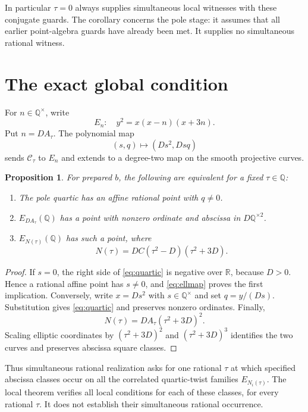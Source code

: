 \documentclass[11pt,a4paper]{article}
\newtheorem{proposition}[theorem]{Proposition}
\theoremstyle{definition}\newtheorem{definition}[theorem]{Definition}
\newcommand{\Q}{\mathbb Q}\newcommand{\F}{\mathbb F}
\begin{document}
In particular $\tau=0$ always supplies simultaneous local witnesses with
these conjugate guards. The corollary concerns the pole stage: it assumes
that all earlier point-algebra guards have already been met. It supplies
no simultaneous rational witness.

\section{The exact global condition}

For $n\in\Q^\times$, write
\[
                        E_n:\quad y^2=x(x-n)(x+3n).
\]
Put $n=DA_\tau$. The polynomial map
\begin{equation}\label{eq:ellmap}
                    (s,q)\longmapsto (Ds^2,Dsq)
\end{equation}
sends $\mathcal C_\tau$ to $E_n$ and extends to a degree-two map on
the smooth projective curves.

\begin{samepage}
\begin{proposition}\label{prop:global}
For prepared $b$, the following are equivalent for a fixed $\tau\in\Q$:
\begin{enumerate}
\item The pole quartic has an affine rational point with $q\ne0$.
\item $E_{DA_\tau}(\Q)$ has a point with nonzero ordinate and abscissa
in $D\Q^{\times2}$.
\item $E_{N(\tau)}(\Q)$ has such a point, where
\[
             N(\tau)=DC(\tau^2-D)(\tau^2+3D).
\]
\end{enumerate}
\end{proposition}
\end{samepage}
\begin{proof}
If $s=0$, the right side of \eqref{eq:quartic} is negative over
$\mathbb R$, because $D>0$. Hence a rational affine point has $s\ne0$,
and \eqref{eq:ellmap} proves the first implication. Conversely, write
$x=Ds^2$ with $s\in\Q^\times$ and set $q=y/(Ds)$. Substitution gives
\eqref{eq:quartic} and preserves nonzero ordinates. Finally,
\[
        N(\tau)=DA_\tau(\tau^2+3D)^2.
\]
Scaling elliptic coordinates by $(\tau^2+3D)^2$ and
$(\tau^2+3D)^3$ identifies the two curves and preserves abscissa
square classes.
\end{proof}

Thus simultaneous rational realization asks for one rational $\tau$ at
which specified abscissa classes occur on all the correlated quartic-twist
families $E_{N_i(\tau)}$. The local theorem verifies all local conditions
for each of these classes, for every rational $\tau$. It does not establish
their simultaneous rational occurrence.
\end{document}
